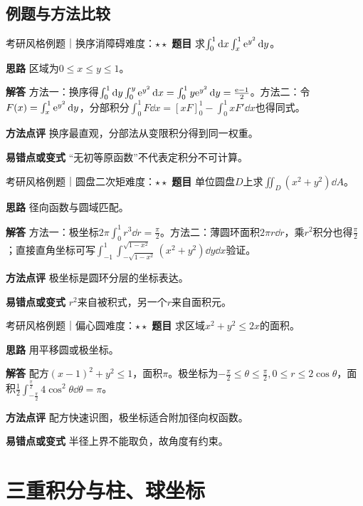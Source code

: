 \subsection{例题与方法比较}
\begin{example}{考研风格例题｜换序消障碍}{难度：$\star\star$}
\label{ex:7:4}\textbf{题目} 求$\int_0^1\mathop{}\!\mathrm{d} x\int_x^1\mathrm{e}^{y^2}\mathop{}\!\mathrm{d} y$。\par
\textbf{思路} 区域为$0\le x\le y\le1$。\par
\textbf{解答} 方法一：换序得$\int_0^1\mathop{}\!\mathrm{d} y\int_0^y\mathrm{e}^{y^2}\mathop{}\!\mathrm{d} x=\int_0^1y\mathrm{e}^{y^2}\mathop{}\!\mathrm{d} y=\frac{\mathrm{e}-1}{2}$。方法二：令$F(x)=\int_x^1\mathrm{e}^{y^2}\mathop{}\!\mathrm{d} y$，分部积分$\int_0^1F\dd x=[xF]_0^1-\int_0^1xF\prime\dd x$也得同式。\par
\textbf{方法点评} 换序最直观，分部法从变限积分得到同一权重。\par
\textbf{易错点或变式} “无初等原函数”不代表定积分不可计算。
\end{example}
\begin{example}{考研风格例题｜圆盘二次矩}{难度：$\star\star$}
\label{ex:7:5}\textbf{题目} 单位圆盘$D$上求$\iint_D(x^2+y^2)\dd A$。\par
\textbf{思路} 径向函数与圆域匹配。\par
\textbf{解答} 方法一：极坐标$2\pi\int_0^1r^3\dd r=\frac{\pi}{2}$。方法二：薄圆环面积$2\pi r\dd r$，乘$r^2$积分也得$\frac{\pi}{2}$；直接直角坐标可写$\int_{-1}^1\int_{-\sqrt{1-x^2}}^{\sqrt{1-x^2}}(x^2+y^2)\dd y\dd x$验证。\par
\textbf{方法点评} 极坐标是圆环分层的坐标表达。\par
\textbf{易错点或变式} $r^2$来自被积式，另一个$r$来自面积元。
\end{example}
\begin{example}{考研风格例题｜偏心圆}{难度：$\star\star$}
\label{ex:7:6}\textbf{题目} 求区域$x^2+y^2\le2x$的面积。\par
\textbf{思路} 用平移圆或极坐标。\par
\textbf{解答} 配方$(x-1)^2+y^2\le1$，面积$\pi$。极坐标为$-\frac{\pi}{2}\le\theta\le\frac{\pi}{2},0\le r\le2\cos\theta$，面积$\frac12\int_{-\frac{\pi}{2}}^{\frac{\pi}{2}}4\cos^2\theta\dd\theta=\pi$。\par
\textbf{方法点评} 配方快速识图，极坐标适合附加径向权函数。\par
\textbf{易错点或变式} 半径上界不能取负，故角度有约束。
\end{example}
\section{三重积分与柱、球坐标}\label{sec:7:3}
